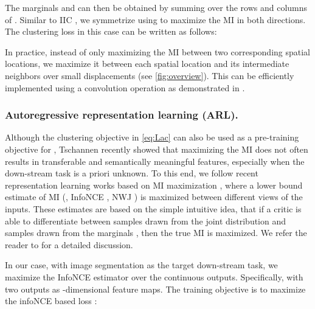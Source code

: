 The marginals  and  can then be obtained by
summing over the rows and columns of .
Similar to IIC \cite{IIC}, we symmetrize  using
 to
maximize the MI in both directions.
The clustering loss  in this case can be written as follows:


In practice, instead of only maximizing the MI between two corresponding spatial locations,
we maximize it between each spatial location and its intermediate neighbors over small
displacements  (see \cref{fig:overview}). This can be efficiently implemented
using a convolution operation as demonstrated in \cite{IIC}.







\subsubsection{Autoregressive representation learning (ARL).} \label{arl}
Although the clustering objective in \cref{eq:Lac} can also
be used as a pre-training objective for , Tschannen \etal
\cite{onMImaximization} recently showed  that maximizing 
the MI does not often results in transferable and semantically meaningful features, especially when
the down-stream task is a priori unknown.
To this end, we follow recent representation learning works based on MI maximization
\cite{cpc,infomax,amdim,CMC}, where a lower bound estimate of MI
(\eg, InfoNCE \cite{cpc}, NWJ \cite{NWJ}) is maximized between different views
of the inputs. These estimates are based on the simple intuitive idea, that
if a critic  is able to differentiate between samples drawn from
the joint distribution  and samples drawn from the marginals ,
then the true MI is maximized.
We refer the reader to \cite{onMImaximization} for a detailed discussion.

In our case, with image segmentation as the target down-stream task, 
we maximize the InfoNCE estimator \cite{cpc} over the continuous outputs.
Specifically, with two outputs
 as -dimensional feature maps.
The training objective is to maximize the infoNCE
based loss :



